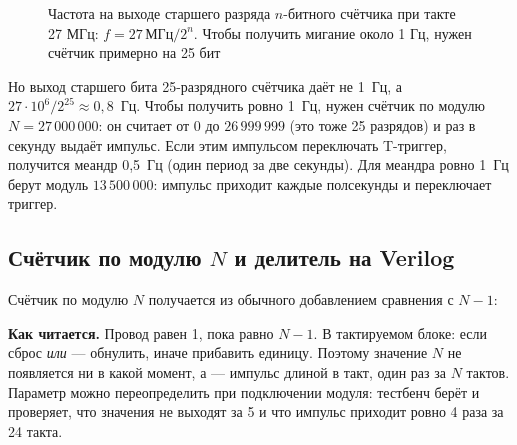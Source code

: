 \begin{figure}[H]
\centering
{}
\caption{Частота на выходе старшего разряда $n$-битного счётчика при такте
27 МГц: $f = 27\,\text{МГц}/2^n$. Чтобы получить мигание около 1 Гц, нужен
счётчик примерно на 25 бит}
\label{fig:div_plot}
\end{figure}

Но выход старшего бита 25-разрядного счётчика даёт не 1~Гц, а
$27\cdot10^6/2^{25}\approx0{,}8$~Гц. Чтобы получить ровно 1~Гц, нужен счётчик
по модулю $N=27\,000\,000$: он считает от 0 до $26\,999\,999$ (это тоже 25
разрядов) и раз в секунду выдаёт импульс. Если этим импульсом переключать
T-триггер, получится меандр 0,5~Гц (один период за две секунды). Для
меандра ровно 1~Гц берут модуль $13\,500\,000$: импульс приходит каждые полсекунды
и переключает триггер.

\subsection{Счётчик по модулю $N$ и делитель на Verilog}
\label{sec:regs-div-v}

Счётчик по модулю $N$ получается из обычного добавлением сравнения с
$N-1$:


\textbf{Как читается.} Провод  равен 1, пока  равно $N-1$.
В тактируемом блоке: если сброс \emph{или}  --- обнулить, иначе
прибавить единицу. Поэтому значение $N$ не появляется ни в какой момент, а
 --- импульс длиной в такт, один раз за $N$ тактов. Параметр
 можно переопределить при подключении модуля: тестбенч берёт
 и проверяет, что значения не выходят за 5 и что импульс приходит
ровно 4 раза за 24 такта.

